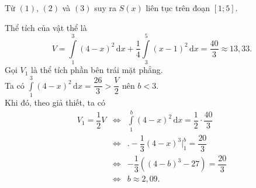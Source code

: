 \begin{ex}
{\begin{itemchoice}
\begin{itemize}
\begin{itemize}
				\end{itemize}
				Từ $(1)$, $(2)$ và $(3)$ suy ra $S(x)$ liên tục trên đoạn $[1;5]$.
			\end{itemize}
			\itemch Thể tích của vật thể là \[V=\displaystyle\int\limits_1^3(4-x)^2\mathrm{\,d}x+\dfrac{1}{4}\displaystyle\int\limits_3^5(x-1)^2\mathrm{\,d}x=\dfrac{40}{3}\approx 13{,}33.\]
			\itemch Gọi $V_1$ là thể tích phần bên trái mặt phẳng.\\
			Ta có $\displaystyle\int\limits_1^3(4-x)^2\mathrm{\,d}x = \dfrac{26}{3} > \dfrac{V}{2}$ nên $b < 3$.\\
			Khi đó, theo giả thiết, ta có \allowdisplaybreaks
			\begin{eqnarray*}
				V_1=\dfrac{1}{2}V&\Leftrightarrow& \displaystyle\int\limits_1^b(4-x)^2\mathrm{\,d}x=\dfrac{1}{2}\cdot\dfrac{40}{3}\\
				&\Leftrightarrow& \big.-\dfrac{1}{3}(4-x)^3\bigg|_1^b=\dfrac{20}{3}\\
				&\Leftrightarrow& -\dfrac{1}{3}\left((4-b)^3-27\right)=\dfrac{20}{3}\\
				&\Leftrightarrow& b\approx 2{,}09.
			\end{eqnarray*}
		\end{itemchoice}
	}
\end{ex}

